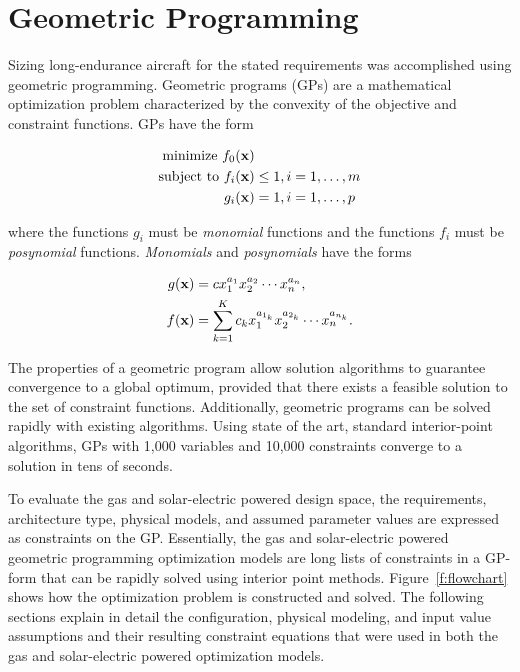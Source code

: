 \section{Geometric Programming}

Sizing long-endurance aircraft for the stated requirements was accomplished using geometric programming. 
Geometric programs (GPs) are a mathematical optimization problem characterized by the convexity of the objective and constraint functions.\cite{gp} GPs have the form

\begin{align} 
\label{e:gpform}
\text{minimize } f_0(\bold{x}) & \nonumber \\
\text{subject to  } f_i(\bold{x}) &\leq 1, i=1,\ldots,m \\
g_i (\bold{x}) &= 1, i = 1,\ldots,p 
\end{align}

where the functions $g_i$ must be \emph{monomial} functions and the functions $f_i$ must be \emph{posynomial} functions. \emph{Monomials} and \emph{posynomials} have the forms

\begin{align}
 \label{e:mon}
g(\bold{x}) &= c x_1^{a_1} x_2^{a_2} \dotsm x_n^{a_n} , \\
\label{e:pos}
f(\bold{x}) &= \displaystyle\sum_{k=1}^K c_k x_1^{a_{1_k}} x_2^{a_{2_k}} \dotsm x_n^{a_{n_k}}.
\end{align}

The properties of a geometric program allow solution algorithms to guarantee convergence to a global optimum, provided that there exists a feasible solution to the set of constraint functions.  
Additionally, geometric programs can be solved rapidly with existing algorithms.  
Using state of the art, standard interior-point algorithms, GPs with 1,000 variables and 10,000 constraints converge to a solution in tens of seconds.\cite{gp}  

To evaluate the gas and solar-electric powered design space, the requirements, architecture type, physical models, and assumed parameter values are expressed as constraints on the GP.\cite{hoburgthesis} 
Essentially, the gas and solar-electric powered geometric programming optimization models are long lists of constraints in a GP-form that can be rapidly solved using interior point methods.  
Figure~\ref{f:flowchart} shows how the optimization problem is constructed and solved. 
The following sections explain in detail the configuration, physical modeling, and input value assumptions and their resulting constraint equations that were used in both the gas and solar-electric powered optimization models.

